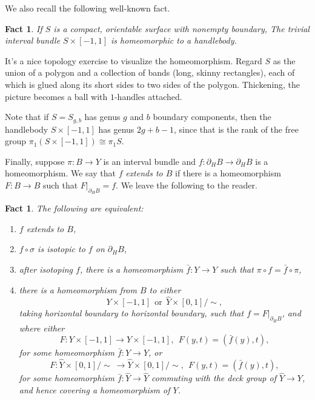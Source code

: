 \documentclass[12pt]{amsart}
\newtheorem{fact}[theorem]{Fact}
\theoremstyle{definition}
\theoremstyle{remark}
\newcommand{\note}[1]{\marginpar{\tiny \raggedright \color{red} #1 }}
\begin{document}
\medskip

We also recall the following well-known fact.

\begin{fact}
If $S$ is a compact, orientable surface with nonempty boundary, The trivial interval bundle $S \times [-1,1]$ is homeomorphic to a handlebody.
\end{fact}

It's a nice topology exercise to visualize the homeomorphism. Regard $S$ as the union of a polygon and a collection of bands (long, skinny rectangles), each of which is glued along its short sides to two sides of the polygon. Thickening, the picture becomes a ball with $1$-handles attached. 

Note that if $S=S_{g,b}$ has genus $g$ and $b$ boundary components, then the handlebody $S\times [-1,1]$ has genus $2g+b-1$, since that is the rank of the free group $\pi_1(S \times [-1,1])\cong \pi_1 S$. 

Finally, suppose $\pi : B \longrightarrow Y$ is an interval bundle and $f : \partial_HB \longrightarrow \partial_HB$ is a homeomorphism. We say that $f$ \emph{extends to $B$} if there is a homeomorphism $F:B \longrightarrow B$ such that $F|_{\partial_HB}=f$. We leave the following to the reader. %

\begin{fact}\label{extendfact}
The following are equivalent:
	\begin{enumerate}
		\item $f$ extends to $B$,
		\item $f \circ \sigma$ is isotopic to $f$ on $\partial_HB$, 
		\item after isotoping $f$, there is a homeomorphism $\bar f : Y \longrightarrow Y$ such that $\pi \circ f = \bar f \circ \pi$,
		\item there is a homeomorphism from $B$ to either $$Y \times [-1,1] \ \ \text{or} \ \ \hat Y \times [0,1]/\sim,$$ taking horizontal boundary to horizontal boundary, such that $f=F|_{\partial_HB}$, and where either
		$$F : Y \times [-1,1] \longrightarrow Y \times [-1,1], \ \ F(y,t)=(\bar f(y),t),$$
		for some homeomorphism $\bar f :Y\longrightarrow Y$, or 
			$$F : \hat Y \times [0,1]/\sim \ \longrightarrow \hat Y \times [0,1]/\sim, \ \ F(y,t)=(\bar f(y),t),$$
			for some homeomorphism $\bar f :\hat Y\longrightarrow \hat Y$ commuting with the deck group of $\hat Y\longrightarrow Y$, and hence covering a homeomorphism of $Y$.
	\end{enumerate}
\end{fact}
\end{document}
